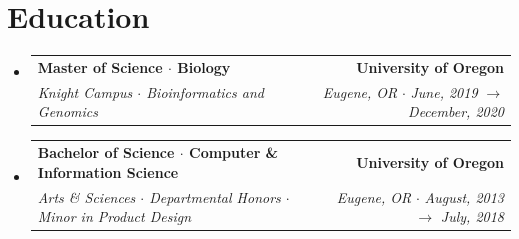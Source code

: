 \documentclass[letterpaper,10pt]{article}
\makeatletter
\newcommand{\resumeSubheading}[6]{
  \vspace{-3pt}\item
    \begin{tabular*}{0.97\textwidth}[t]{l@{\extracolsep{\fill}}r}
      \textbf{#1} & \textbf{#2} \\
      \textit{\small#6}&\textit{\small#5} $\cdot$ \textit{#3} $\rightarrow$ \textit{#4} \\
    \end{tabular*}\vspace{-2pt}
}
\newcommand{\resumeSubHeadingListStart}{\begin{itemize}[leftmargin=*]}
\newcommand{\resumeSubHeadingListEnd}{\end{itemize}}
\makeatother
\begin{document}
{%



}

\section{Education}
    \resumeSubHeadingListStart
        \resumeSubheading
            {Master of Science $\cdot$ Biology}
            {University of Oregon}
            {June, 2019}
            {December, 2020}
            {Eugene, OR}
            {Knight Campus $\cdot$ Bioinformatics and Genomics}
        \resumeSubheading
            {Bachelor of Science $\cdot$ Computer \& Information Science}
            {University of Oregon}
            {August, 2013}
            {July, 2018}
            {Eugene, OR}
            {Arts \& Sciences $\cdot$ Departmental Honors $\cdot$ Minor in Product Design}
    \resumeSubHeadingListEnd
\end{document}
